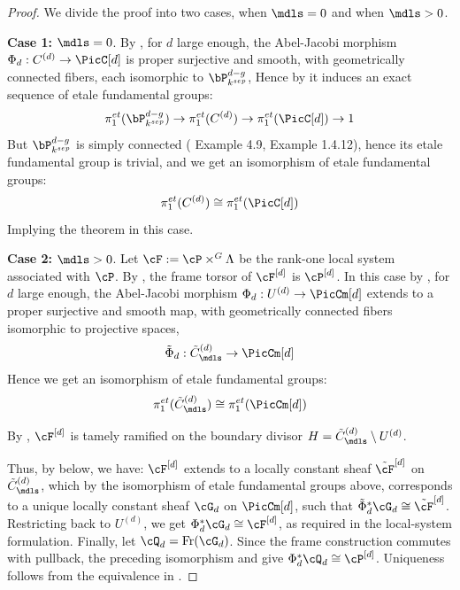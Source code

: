 \begin{proof}
We divide the proof into two cases, when $\mdls = 0$ and when $\mdls > 0$.

\textbf{Case 1:} $\mdls = 0$.
By , for $d$ large enough,
the Abel-Jacobi morphism $\Phi_d : C^{(d)} \to \PicC[d]$ is proper surjective and smooth, with geometrically connected fibers,
each isomorphic to $\bP_{k^{sep}}^{d-g}$, 
Hence by  it induces an exact sequence of etale fundamental groups:
\[ \pi_1^{et}(\bP_{k^{sep}}^{d-g}) \to \pi_1^{et}(C^{(d)}) \to \pi_1^{et}(\PicC[d]) \to 1 \]
But $\bP_{k^{sep}}^{d-g}$  is simply connected (\cite{tendler2015geometricclassfieldtheory} Example 4.9, \cite{Toth2011} Example 1.4.12), 
hence its etale fundamental group is trivial, and we get an isomorphism of etale fundamental groups:
$$ \pi_1^{et}(C^{(d)}) \cong \pi_1^{et}(\PicC[d]) $$
Implying the theorem in this case.

\textbf{Case 2:} $\mdls > 0$.
Let $\cF:=\cP\times^G\Lambda$ be the rank-one local system associated with
$\cP$. By , the frame torsor of
$\cF^{[d]}$ is $\cP^{[d]}$.
In this case by , for $d$ large enough, the Abel-Jacobi morphism $\Phi_d : U^{(d)} \to \PicCm[d]$ 
extends to a proper surjective and smooth map, with geometrically connected fibers isomorphic to projective spaces, 
$$ \tilde{\Phi}_d : \tilde{C}^{(d)}_\mdls \to \PicCm[d] $$ 
Hence we get an isomorphism of etale fundamental groups:
$$ \pi_1^{et}(\tilde{C}^{(d)}_\mdls) \cong \pi_1^{et}(\PicCm[d]) $$

By , 
$\cF^{[d]}$ is tamely ramified on the boundary divisor $H = \tilde{C}^{(d)}_\mdls \setminus U^{(d)}$.

Thus, by  below, we have:
$\cF^{[d]}$ extends to a locally constant sheaf $\tilde{\cF}^{[d]}$ on $\tilde{C}^{(d)}_\mdls$, 
which by the isomorphism of etale fundamental groups above, corresponds to a unique locally constant sheaf $\cG_d$ on $\PicCm[d]$,
such that $\tilde{\Phi}_d^* \cG_d \cong \tilde{\cF}^{[d]}$.
Restricting back to $U^{(d)}$, we get $\Phi_d^* \cG_d \cong \cF^{[d]}$,
as required in the local-system formulation. Finally, let
$\cQ_d=\operatorname{Fr}(\cG_d)$. Since the frame construction commutes with
pullback, the preceding isomorphism and
 give
$\Phi_d^*\cQ_d\cong\cP^{[d]}$. Uniqueness follows from the equivalence in
.
\end{proof}


